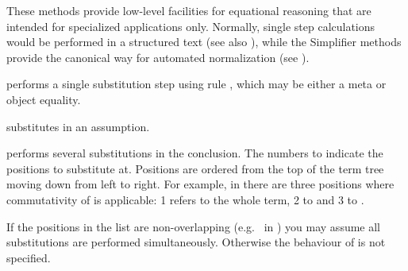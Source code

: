 \begin{isabellebody}
\begin{isamarkuptext}
  These methods provide low-level facilities for equational reasoning
  that are intended for specialized applications only.  Normally,
  single step calculations would be performed in a structured text
  (see also ), while the Simplifier methods
  provide the canonical way for automated normalization (see
  ).

  \begin{descr}

  \item [\hyperlink{method.subst}{\mbox{\isa{subst}}}~\isa{eq}] performs a single substitution
  step using rule , which may be either a meta or object
  equality.

  \item [\hyperlink{method.subst}{\mbox{\isa{subst}}}~\isa{{\isachardoublequote}{\isacharparenleft}asm{\isacharparenright}\ eq{\isachardoublequote}}] substitutes in an
  assumption.

  \item [\hyperlink{method.subst}{\mbox{\isa{subst}}}~\isa{{\isachardoublequote}{\isacharparenleft}i\ {\isasymdots}\ j{\isacharparenright}\ eq{\isachardoublequote}}] performs several
  substitutions in the conclusion. The numbers  to 
  indicate the positions to substitute at.  Positions are ordered from
  the top of the term tree moving down from left to right. For
  example, in  there are three positions
  where commutativity of \isa{{\isachardoublequote}{\isacharplus}{\isachardoublequote}} is applicable: 1 refers to the
  whole term, 2 to  and 3 to .

  If the positions in the list  are non-overlapping
  (e.g.\  in ) you may
  assume all substitutions are performed simultaneously.  Otherwise
  the behaviour of  is not specified.


\end{descr}
\end{isamarkuptext}
\end{isabellebody}
